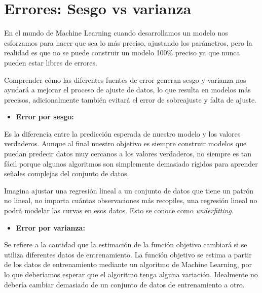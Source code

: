 \documentclass[
]{book}
\providecommand{\tightlist}{%
  \setlength{\itemsep}{0pt}\setlength{\parskip}{0pt}}
\begin{document}
\hypertarget{errores-sesgo-vs-varianza}{%
\section{Errores: Sesgo vs varianza}\label{errores-sesgo-vs-varianza}}

En el mundo de Machine Learning cuando desarrollamos un modelo nos esforzamos para hacer que sea lo más preciso, ajustando los parámetros, pero la realidad es que no se puede construir un modelo 100\% preciso ya que nunca pueden estar libres de errores.

Comprender cómo las diferentes fuentes de error generan sesgo y varianza nos ayudará a mejorar el proceso de ajuste de datos, lo que resulta en modelos más precisos, adicionalmente también evitará el error de sobreajuste y falta de ajuste.

\begin{itemize}
\tightlist
\item
  \textbf{Error por sesgo:}
\end{itemize}

Es la diferencia entre la predicción esperada de nuestro modelo y los valores verdaderos. Aunque al final nuestro objetivo es siempre construir modelos que puedan predecir datos muy cercanos a los valores verdaderos, no siempre es tan fácil porque algunos algoritmos son simplemente demasiado rígidos para aprender señales complejas del conjunto de datos.

Imagina ajustar una regresión lineal a un conjunto de datos que tiene un patrón no lineal, no importa cuántas observaciones más recopiles, una regresión lineal no podrá modelar las curvas en esos datos. Esto se conoce como \emph{underfitting}.

\begin{itemize}
\tightlist
\item
  \textbf{Error por varianza:}
\end{itemize}

Se refiere a la cantidad que la estimación de la función objetivo cambiará si se utiliza diferentes datos de entrenamiento. La función objetivo se estima a partir de los datos de entrenamiento mediante un algoritmo de Machine Learning, por lo que deberíamos esperar que el algoritmo tenga alguna variación. Idealmente no debería cambiar demasiado de un conjunto de datos de entrenamiento a otro.
\end{document}
